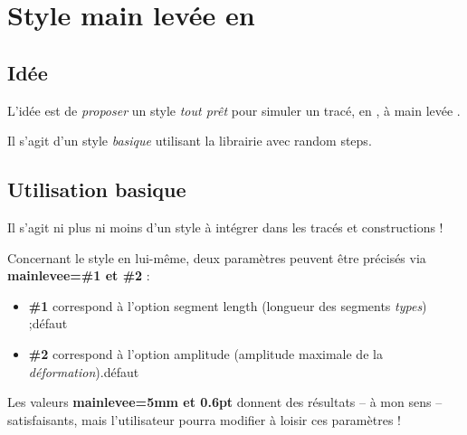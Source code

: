 \documentclass{article}
\newcommand\ctex[1]{\tcbox[vignettelatex]{#1}}
\newcommand\Cle[1]{{\bfseries\sffamily\textlangle #1\textrangle}}
\begin{document}
\newpage

\section{Style \og main levée \fg{} en \TikZ}\label{mainlevee}

\subsection{Idée}

\begin{codeidee}
L'idée est de \textit{proposer} un style \textit{tout prêt} pour simuler un tracé, en \TikZ, à \og main levée \fg.

Il s'agit d'un style \textit{basique} utilisant la librairie \ctex{decorations} avec \textsf{random steps}.
\end{codeidee}

\begin{codetex}
\end{codetex}

\subsection{Utilisation basique}

\begin{codeinfo}
Il s'agit ni plus ni moins d'un style \TikZ{} à intégrer dans les tracés et constructions \TikZ !
\end{codeinfo}

\begin{codecles}
Concernant le style en lui-même, deux paramètres peuvent être précisés via \Cle{mainlevee=\#1 et \#2} :

\begin{itemize}
	\item \Cle{\#1} correspond à l'option \textsf{segment length} (longueur des segments \textit{types}) ;\hfill{}défaut \Cle{5mm}
	\item \Cle{\#2} correspond à l'option \textsf{amplitude} (amplitude maximale de la \textit{déformation}).\hfill{}défaut \Cle{0.6pt}
\end{itemize}

Les valeurs \Cle{mainlevee=5mm et 0.6pt} donnent des résultats -- à mon sens -- satisfaisants, mais l'utilisateur pourra modifier à loisir ces paramètres !
\end{codecles}
\end{document}
